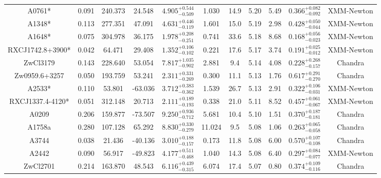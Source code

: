\documentclass{aa}   %
\begin{document}
\begin{table}[h!]
\begin{center}
\begin{tabular}{ c  c  c  c c c c c c c c }
A0761*              		&		0.091	&	240.373	&	24.548	& $	4.905^{+0.544}_{-0.509}$  &      1.030	&  14.9	&	5.20	&	5.49	&	$ 0.366^{+0.082}_{-0.092}  $ &	  XMM-Newton  \\
A1348*              		&		0.113	&	277.351	&	47.091	& $	4.631^{+0.446}_{-0.119}$  &      1.601	&  15.0	&	5.19	&	2.98	&	$ 0.428^{+0.050}_{-0.044}  $ &	  XMM-Newton  \\
A1648*              		&		0.075	&	304.978	&	36.175	& $	1.978^{+0.208}_{-0.251}$  &      0.741	&  33.6	&	5.18	&	8.68	&	$ 0.168^{+0.056}_{-0.023}  $ &	 XMM-Newton   \\
RXCJ1742.8+3900*    		&		0.042	&	64.471	&	29.408	& $	1.352^{+0.106}_{-0.102}$  &      0.221	&  17.6	&	5.17	&	3.74	&	$ 0.191^{+0.025}_{-0.012}  $ &	  XMM-Newton  \\
ZwCl3179            		&		0.143	&	228.640	&	53.054	& $	7.817^{+1.035}_{-0.902}$  &      2.881	&  9.4	&	5.14	&	4.08	&	$ 0.228^{+0.268}_{-0.157}  $ &	  Chandra     \\
Zw0959.6+3257       		&		0.050	&	193.759	&	53.241	& $	2.311^{+0.331}_{-0.269}$  &      0.300	&  11.1	&	5.13	&	1.76	&	$ 0.617^{+0.291}_{-0.270}  $ &	  Chandra     \\
A2533*              		&		0.110	&	53.801	&	-63.036	& $	3.712^{+0.383}_{-0.362}$  &      1.539	&  26.7	&	5.13	&	2.91	&	$ 0.322^{+0.106}_{-0.031}  $ &	  XMM-Newton  \\
RXCJ1337.4-4120*    		&		0.051	&	312.148	&	20.713	& $	2.111^{+0.189}_{-0.193}$  &      0.338	&  21.0	&	5.11	&	8.52	&	$ 0.457^{+0.061}_{-0.067}  $ &	 XMM-Newton   \\
A0209               		&		0.206	&	159.877	&	-73.507	& $	9.250^{+0.936}_{-0.712}$  &      5.681	&  10.4	&	5.10	&	1.51	&	$ 0.370^{+0.187}_{-0.181}  $ &	  Chandra     \\
A1758a              		&		0.280	&	107.128	&	65.292	& $	8.830^{+0.330}_{-0.279}$  &     11.024	&  9.5	&	5.08	&	1.06	&	$ 0.263^{+0.065}_{-0.058}  $ &	  Chandra     \\
A3744               		&		0.038	&	21.436	&	-40.136	& $	3.010^{+0.188}_{-0.157}$  &      0.173	&  11.8	&	5.08	&	6.00	&	$ 0.570^{+0.107}_{-0.108}  $ &	 Chandra      \\
A2442               		&		0.090	&	56.917	&	-49.823	& $	4.177^{+0.511}_{-0.468}$  &      1.040	&  14.3	&	5.08	&	6.40	&	$ 0.297^{+0.084}_{-0.077}  $ &	 XMM-Newton   \\
ZwCl2701            		&		0.214	&	163.870	&	48.543	& $	6.116^{+0.439}_{-0.315}$  &      6.074	&  17.4	&	5.07	&	0.80	&	$ 0.374^{+0.109}_{-0.116}  $ &	  Chandra     \\

\end{tabular}
\end{center}
\end{table}
\end{document}
